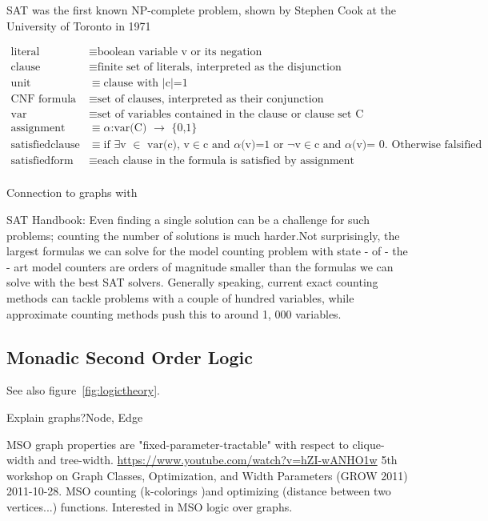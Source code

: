 \documentclass[a4paper, 12pt]{scrartcl}
\begin{document}
SAT was the first known NP-complete problem, shown by Stephen Cook at the University of Toronto in 1971 \cite{SAT1971}

\begin{align*}
\text{literal}&\equiv \text{boolean variable v or its negation} \\
\text{clause}&\equiv \text{finite set of literals, interpreted as the disjunction} \\
\text{unit}&\equiv \text{clause with $|$c$|$=1} \\
\text{CNF formula}&\equiv \text{set of clauses, interpreted as their conjunction} \\
\text{var}&\equiv \text{set of variables contained in the clause or clause set C} \\
\text{assignment}&\equiv \text{$\alpha $:var(C) $\to $ \{0,1\}} \\
\text{satisfiedclause}&\equiv \text{if $\exists $v $\in $ var(c), v$\in $c and $\alpha $(v)=1 or $\neg $v$\in $c and $\alpha $(v)= 0. Otherwise falsified}\\ 
\text{satisfiedform}&\equiv \text{each clause in the formula is satisfied by assignment} \\
\end{align*}

Connection to graphs with \cite{DiplomarbeitZisser}

SAT Handbook:
Even finding a single solution can be a challenge
for such problems; counting the number of solutions is much harder.Not
surprisingly, the largest formulas we can solve for the model counting problem
with state - of - the - art model counters are orders of magnitude smaller than the
formulas we can solve with the best SAT solvers. Generally speaking, current
exact counting methods can tackle problems with a couple of hundred variables, while approximate counting methods push this to around 1, 000 variables.


\subsection{Monadic Second Order Logic}
See also figure~\ref{fig:logictheory}.

Explain graphs?Node, Edge

MSO graph properties are "fixed-parameter-tractable" with respect to clique-width and tree-width. 
\url{https://www.youtube.com/watch?v=hZI-wANHO1w} 5th workshop on Graph Classes, Optimization, and Width Parameters (GROW 2011)
2011-10-28.
MSO counting (k-colorings )and optimizing (distance between two vertices...) functions.
Interested in MSO logic over graphs.
\end{document}
